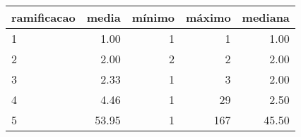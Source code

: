\begin{table}[ht]
\centering
\begin{tabular}{lrrrr}
  \hline
ramificacao & media & mínimo & máximo & mediana \\ 
  \hline
1 & 1.00 &   1 &   1 & 1.00 \\ 
  2 & 2.00 &   2 &   2 & 2.00 \\ 
  3 & 2.33 &   1 &   3 & 2.00 \\ 
  4 & 4.46 &   1 &  29 & 2.50 \\ 
  5 & 53.95 &   1 & 167 & 45.50 \\ 
   \hline
\end{tabular}
\end{table}
